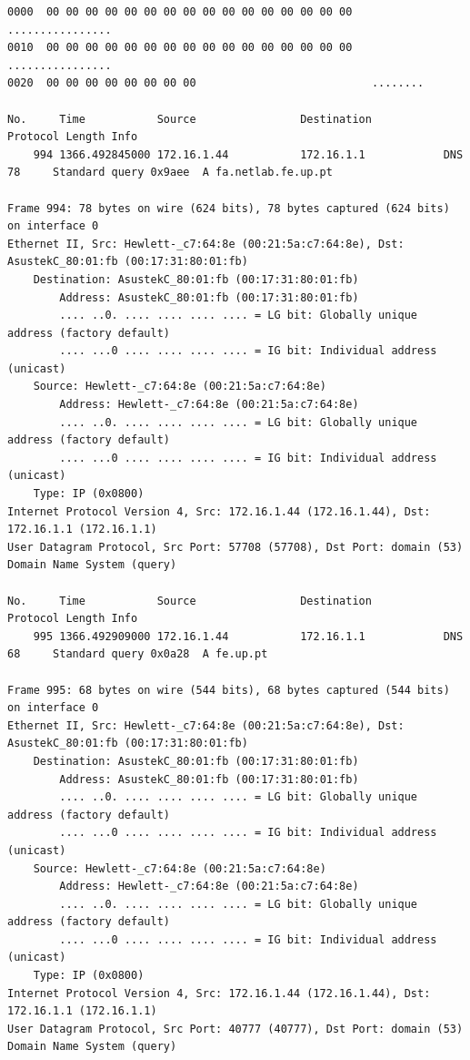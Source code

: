 \documentclass[a4paper,11pt]{article}
\begin{document}
\begin{lstlisting}
0000  00 00 00 00 00 00 00 00 00 00 00 00 00 00 00 00   ................
0010  00 00 00 00 00 00 00 00 00 00 00 00 00 00 00 00   ................
0020  00 00 00 00 00 00 00 00                           ........

No.     Time           Source                Destination           Protocol Length Info
    994 1366.492845000 172.16.1.44           172.16.1.1            DNS      78     Standard query 0x9aee  A fa.netlab.fe.up.pt

Frame 994: 78 bytes on wire (624 bits), 78 bytes captured (624 bits) on interface 0
Ethernet II, Src: Hewlett-_c7:64:8e (00:21:5a:c7:64:8e), Dst: AsustekC_80:01:fb (00:17:31:80:01:fb)
    Destination: AsustekC_80:01:fb (00:17:31:80:01:fb)
        Address: AsustekC_80:01:fb (00:17:31:80:01:fb)
        .... ..0. .... .... .... .... = LG bit: Globally unique address (factory default)
        .... ...0 .... .... .... .... = IG bit: Individual address (unicast)
    Source: Hewlett-_c7:64:8e (00:21:5a:c7:64:8e)
        Address: Hewlett-_c7:64:8e (00:21:5a:c7:64:8e)
        .... ..0. .... .... .... .... = LG bit: Globally unique address (factory default)
        .... ...0 .... .... .... .... = IG bit: Individual address (unicast)
    Type: IP (0x0800)
Internet Protocol Version 4, Src: 172.16.1.44 (172.16.1.44), Dst: 172.16.1.1 (172.16.1.1)
User Datagram Protocol, Src Port: 57708 (57708), Dst Port: domain (53)
Domain Name System (query)

No.     Time           Source                Destination           Protocol Length Info
    995 1366.492909000 172.16.1.44           172.16.1.1            DNS      68     Standard query 0x0a28  A fe.up.pt

Frame 995: 68 bytes on wire (544 bits), 68 bytes captured (544 bits) on interface 0
Ethernet II, Src: Hewlett-_c7:64:8e (00:21:5a:c7:64:8e), Dst: AsustekC_80:01:fb (00:17:31:80:01:fb)
    Destination: AsustekC_80:01:fb (00:17:31:80:01:fb)
        Address: AsustekC_80:01:fb (00:17:31:80:01:fb)
        .... ..0. .... .... .... .... = LG bit: Globally unique address (factory default)
        .... ...0 .... .... .... .... = IG bit: Individual address (unicast)
    Source: Hewlett-_c7:64:8e (00:21:5a:c7:64:8e)
        Address: Hewlett-_c7:64:8e (00:21:5a:c7:64:8e)
        .... ..0. .... .... .... .... = LG bit: Globally unique address (factory default)
        .... ...0 .... .... .... .... = IG bit: Individual address (unicast)
    Type: IP (0x0800)
Internet Protocol Version 4, Src: 172.16.1.44 (172.16.1.44), Dst: 172.16.1.1 (172.16.1.1)
User Datagram Protocol, Src Port: 40777 (40777), Dst Port: domain (53)
Domain Name System (query)


\end{lstlisting}
\end{document}
